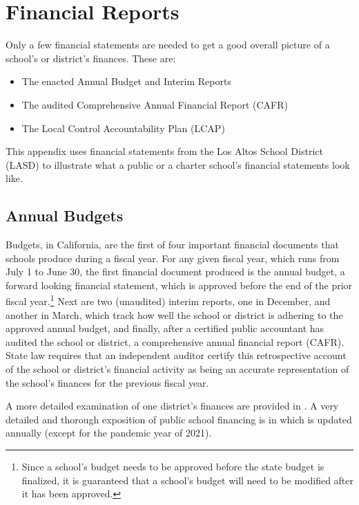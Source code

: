\chapter{Financial Reports}\label{ch:financial_reports}

Only a few financial statements are needed to get a good overall picture of a school's or district's finances. These are:
\begin{itemize}[nosep]\OnehalfSpacing\medskip%
  \item The enacted Annual Budget and Interim Reports
  \item The audited Comprehensive Annual Financial Report (CAFR)
  \item The Local Control Accountability Plan (LCAP)
\end{itemize}\noindent%

This appendix uses financial statements from the Los Altos School District (LASD) to illustrate what a public or a charter school's financial statements look like.

\section{Annual Budgets}\label{sec:annual-budgets}
Budgets, in California, are the first of four important financial documents that schools produce during a fiscal year. For any given fiscal year, which runs from July 1 to June 30, the first financial document produced is the annual budget, a forward looking financial statement, which is approved before the end of the prior fiscal year.\footnote{Since a school's budget needs to be approved before the state budget is finalized, it is guaranteed that a school's budget will need to be modified after it has been approved.} Next are two (unaudited) interim reports, one in December, and another in March,  which track how well the school or district is adhering to the approved annual budget, and finally, after a certified public accountant has audited the school or district, a comprehensive annual financial report (CAFR). State law requires that an independent auditor certify this retrospective account of the school or district's financial activity as being an accurate representation of the school's finances for the previous fiscal year.

A more detailed examination of one district's finances are provided in .  A very detailed and thorough exposition of public school financing is in \textcite{Aguinaldo.etal2021} which is updated annually (except for the pandemic year of 2021).

